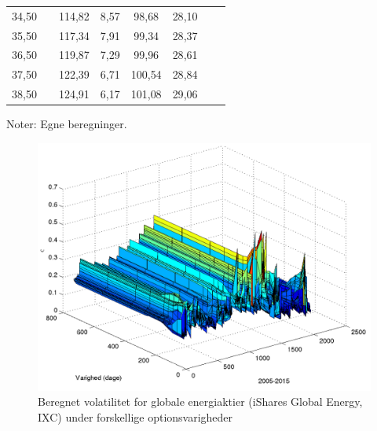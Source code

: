 \documentclass{article}
\begin{document}
\begin{table}[h]
\begin{center}
\begin{tabular}{cXcccccr}
         34{,}50   &&     114{,}82     &     8{,}57&         98{,}68     &    28{,}10 \\
         35{,}50    &&    117{,}34     &     7{,}91&         99{,}34   &      28{,}37 \\
         36{,}50    &&    119{,}87     &     7{,}29&         99{,}96    &     28{,}61 \\
         37{,}50    &&    122{,}39      &    6{,}71&        100{,}54  &       28{,}84 \\
         38{,}50    &&    124{,}91     &     6{,}17&        101{,}08&         29{,}06 \\
	\bottomrule[1pt]
	\end{tabular}
\end{center}
	\begin{minipage}{\linewidth}
		\footnotesize{Noter: Egne beregninger. }
	\end{minipage}
\end{table}	

\begin{figure}
\centerline{\includegraphics[scale=0.8]{../matlab/figs/implied_vol_curve_guan}}
\caption{Beregnet volatilitet for globale energiaktier (iShares Global Energy, IXC) under forskellige optionsvarigheder}
\label{fig:option_vol_curve}
\end{figure}
\end{document}
